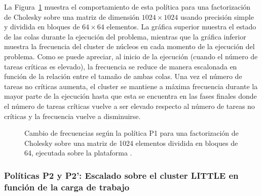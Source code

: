 La Figura~\ref{s5:fig:P1-evo} muestra el comportamiento de esta política
para una factorización de Cholesky sobre una matriz de dimensión
$1024 \times 1024$ usando precisión simple y dividida en bloques de
$64 \times 64$ elementos. La gráfica superior muestra el estado de las
colas durante la ejecución del problema, mientras que la gráfica inferior
muestra la frecuencia del cluster de núcleos \LITTLE en cada momento de la
ejecución del problema. Como se puede apreciar, al inicio de la ejecución
(cuando el número de tareas críticas es elevado), la frecuencia se reduce
de manera escalonada en función de la relación entre el tamaño de ambas
colas. Una vez el número de tareas no críticas aumenta, el cluster se
mantiene a máxima frecuencia durante la mayor parte de la ejecución hasta
que esta se encuentra en las fases finales donde el número de tareas
críticas vuelve a ser elevado respecto al número de tareas no críticas y la
frecuencia vuelve a disminuirse.

\begin{figure}
  \centering
  \caption[Cambio de frecuencias según la política P1]{Cambio de
    frecuencias según la política P1 para una factorización de Cholesky
    sobre una matriz de 1024 elementos dividida en bloques de 64, ejecutada
    sobre la plataforma \juno.}
  \label{s5:fig:P1-evo}
\end{figure}

\subsubsection{Políticas P2 y P2': Escalado sobre el cluster LITTLE en
  función de la carga de trabajo}

